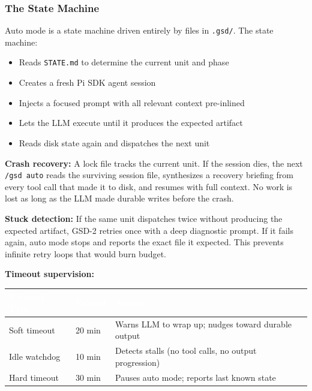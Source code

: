\documentclass[11pt,letterpaper]{article}
\newcommand{\tableheader}[1]{\textbf{\sffamily\textcolor{white}{#1}}}
\begin{document}
\subsubsection{The State Machine}

Auto mode is a state machine driven entirely by files in \texttt{.gsd/}. The state machine:

\begin{itemize}
  \item Reads \texttt{STATE.md} to determine the current unit and phase
  \item Creates a fresh Pi SDK agent session
  \item Injects a focused prompt with all relevant context pre-inlined
  \item Lets the LLM execute until it produces the expected artifact
  \item Reads disk state again and dispatches the next unit
\end{itemize}

\textbf{Crash recovery:} A lock file tracks the current unit. If the session dies, the next \texttt{/gsd auto} reads the surviving session file, synthesizes a recovery briefing from every tool call that made it to disk, and resumes with full context. No work is lost as long as the LLM made durable writes before the crash.

\textbf{Stuck detection:} If the same unit dispatches twice without producing the expected artifact, GSD-2 retries once with a deep diagnostic prompt. If it fails again, auto mode stops and reports the exact file it expected. This prevents infinite retry loops that would burn budget.

\textbf{Timeout supervision:}

\begin{center}
\begin{tabularx}{\textwidth}{L{3cm}L{3cm}X}
\toprule
{}
\tableheader{Timeout Type} & \tableheader{Default} & \tableheader{Action} \\
\midrule
Soft timeout & 20 min & Warns LLM to wrap up; nudges toward durable output \\
Idle watchdog & 10 min & Detects stalls (no tool calls, no output progression) \\
Hard timeout & 30 min & Pauses auto mode; reports last known state \\
\bottomrule
\end{tabularx}
\end{center}
\end{document}

